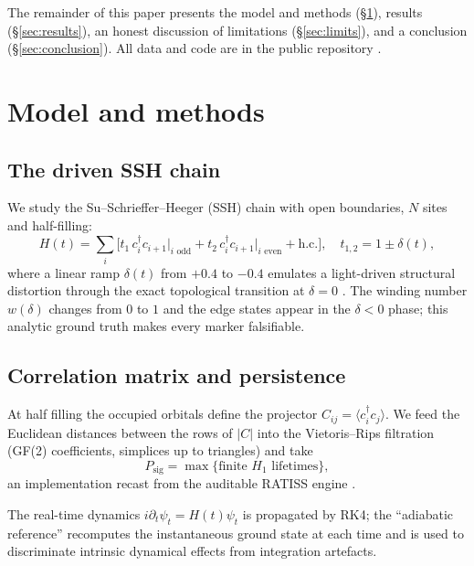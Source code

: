 \documentclass[11pt]{article}
\begin{document}
The remainder of this paper presents the model and methods
(\S\ref{sec:model}), results (\S\ref{sec:results}), an honest discussion of
limitations (\S\ref{sec:limits}), and a conclusion
(\S\ref{sec:conclusion}). All data and code are in the public repository
\cite{repo}.

\section{Model and methods}
\label{sec:model}

\subsection{The driven SSH chain}

We study the Su--Schrieffer--Heeger (SSH) chain \cite{SSH1979,SSH1980} with
open boundaries, $N$ sites and half-filling:
\begin{equation}
H(t) = \sum_{i} \Big[ t_1\,c_i^\dagger c_{i+1} \Big|_{i\text{ odd}} +
t_2\,c_i^\dagger c_{i+1} \Big|_{i\text{ even}} + \mathrm{h.c.}\Big],\quad
t_{1,2} = 1 \pm \delta(t),
\label{eq:ssh}
\end{equation}
where a linear ramp $\delta(t)$ from $+0.4$ to $-0.4$ emulates a light-driven
structural distortion through the exact topological transition at $\delta=0$
\cite{Zak1989}. The winding number $w(\delta)$ changes from $0$ to $1$ and
the edge states appear in the $\delta<0$ phase; this analytic ground truth
makes every marker falsifiable.

\subsection{Correlation matrix and persistence}

At half filling the occupied orbitals define the projector
$C_{ij} = \langle c_i^\dagger c_j\rangle$. We feed the Euclidean distances
between the rows of $|C|$ into the Vietoris--Rips filtration (GF(2)
coefficients, simplices up to triangles) and take
\begin{equation}
P_{\mathrm{sig}} = \max\{\text{finite } H_1 \text{ lifetimes}\},
\label{eq:psig}
\end{equation}
an implementation recast from the auditable RATISS engine \cite{repo}.

The real-time dynamics $i\partial_t\psi_t = H(t)\psi_t$ is propagated by
RK4; the ``adiabatic reference'' recomputes the instantaneous ground state
at each time and is used to discriminate intrinsic dynamical effects from
integration artefacts.
\end{document}
